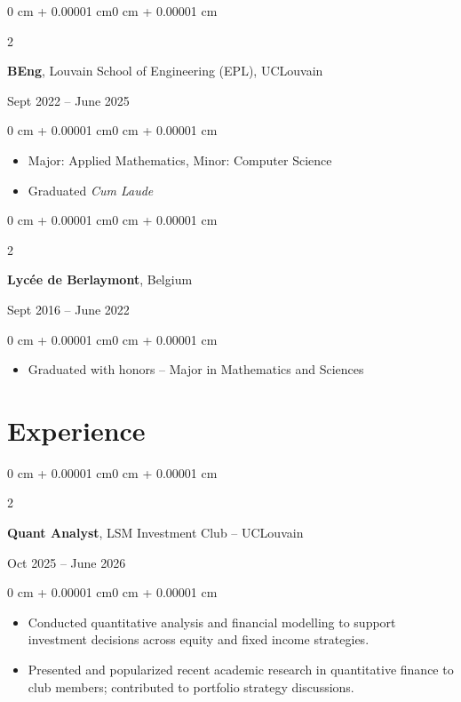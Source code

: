 \documentclass[10pt, letterpaper]{article}
\newenvironment{highlights}{
    \begin{itemize}[
        topsep=0.06 cm,
        parsep=0.06 cm,
        partopsep=0pt,
        itemsep=0pt,
        leftmargin=0 cm + 10pt
    ]
}{
    \end{itemize}
}
\newenvironment{onecolentry}{
    \begin{adjustwidth}{0 cm + 0.00001 cm}{0 cm + 0.00001 cm}
}{
    \end{adjustwidth}
}
\newenvironment{twocolentry}[2][]{
    \onecolentry
    \def\secondColumn{#2}
    \setcolumnwidth{\fill, 4.5 cm}
    \begin{paracol}{2}
}{
    \switchcolumn \raggedleft \secondColumn
    \end{paracol}
    \endonecolentry
}
\begin{document}
        \vspace{0.10 cm}

        \begin{twocolentry}{Sept 2022 – June 2025}
            \textbf{BEng}, Louvain School of Engineering (EPL), UCLouvain
        \end{twocolentry}
        \vspace{0.06 cm}
        \begin{onecolentry}
            \begin{highlights}
                \item Major: Applied Mathematics, Minor: Computer Science
                \item Graduated \textit{Cum Laude}
            \end{highlights}
        \end{onecolentry}

        \vspace{0.10 cm}

        \begin{twocolentry}{Sept 2016 – June 2022}
            \textbf{Lycée de Berlaymont}, Belgium
        \end{twocolentry}
        \vspace{0.06 cm}
        \begin{onecolentry}
            \begin{highlights}
                \item Graduated with honors -- Major in Mathematics and Sciences
            \end{highlights}
        \end{onecolentry}

    \section{Experience}

        \begin{twocolentry}{Oct 2025 – June 2026}
            \textbf{Quant Analyst}, LSM Investment Club -- UCLouvain
        \end{twocolentry}
        \vspace{0.06 cm}
        \begin{onecolentry}
            \begin{highlights}
                \item Conducted quantitative analysis and financial modelling to support investment decisions across equity and fixed income strategies.
                \item Presented and popularized recent academic research in quantitative finance to club members; contributed to portfolio strategy discussions.
            \end{highlights}
        \end{onecolentry}
\end{document}
